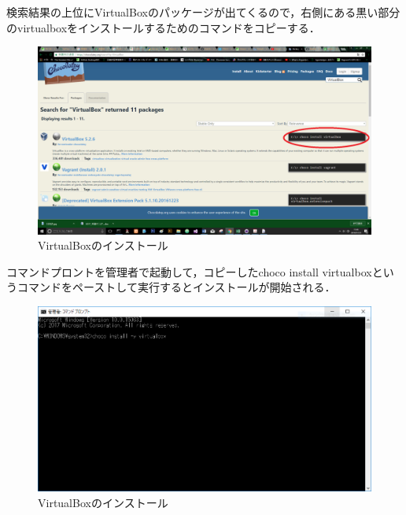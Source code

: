 \newpage



検索結果の上位にVirtualBoxのパッケージが出てくるので，右側にある黒い部分のvirtualboxをインストールするためのコマンドをコピーする．

\begin{figure}[h]
\centering
\includegraphics[width=12cm]{chocoVirt.PNG}
\caption{VirtualBoxのインストール}\label{サンプル図}
\end{figure}




\newpage


コマンドプロントを管理者で起動して，コピーしたchoco install virtualboxというコマンドをペーストして実行するとインストールが開始される．

\begin{figure}[h]
\centering
\includegraphics[width=12cm]{virtualboxinstall.PNG}
\caption{VirtualBoxのインストール}\label{サンプル図}
\end{figure}
\newpage



